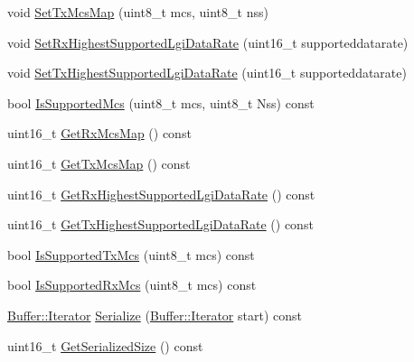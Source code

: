 \begin{DoxyCompactItemize}
\item 
void \hyperlink{classns3_1_1VhtCapabilities_a4acad44449603f46a9a83e858e226fe2}{Set\+Tx\+Mcs\+Map} (uint8\+\_\+t mcs, uint8\+\_\+t nss)
\item 
void \hyperlink{classns3_1_1VhtCapabilities_a76d505e19a02e262781f4b2a137ee316}{Set\+Rx\+Highest\+Supported\+Lgi\+Data\+Rate} (uint16\+\_\+t supporteddatarate)
\item 
void \hyperlink{classns3_1_1VhtCapabilities_ad3f4d476786fab6795be0224dd6ed26e}{Set\+Tx\+Highest\+Supported\+Lgi\+Data\+Rate} (uint16\+\_\+t supporteddatarate)
\item 
bool \hyperlink{classns3_1_1VhtCapabilities_aba04acc79ee860a2542e34a32b2e0bc1}{Is\+Supported\+Mcs} (uint8\+\_\+t mcs, uint8\+\_\+t Nss) const 
\item 
uint16\+\_\+t \hyperlink{classns3_1_1VhtCapabilities_a9047384dc8135824357533a0fcc2d26f}{Get\+Rx\+Mcs\+Map} () const 
\item 
uint16\+\_\+t \hyperlink{classns3_1_1VhtCapabilities_a09f6821d4d89fcf4a7781a2c00b7896f}{Get\+Tx\+Mcs\+Map} () const 
\item 
uint16\+\_\+t \hyperlink{classns3_1_1VhtCapabilities_a4bfa9e42b6b536680d9ce6f6820b92c7}{Get\+Rx\+Highest\+Supported\+Lgi\+Data\+Rate} () const 
\item 
uint16\+\_\+t \hyperlink{classns3_1_1VhtCapabilities_a9f13a856c4c1642836d643d7bef32abd}{Get\+Tx\+Highest\+Supported\+Lgi\+Data\+Rate} () const 
\item 
bool \hyperlink{classns3_1_1VhtCapabilities_a9ce6b770882cb97dca5f1b51ae508974}{Is\+Supported\+Tx\+Mcs} (uint8\+\_\+t mcs) const 
\item 
bool \hyperlink{classns3_1_1VhtCapabilities_a88e22813d583ecc8626822fd3a1f3b75}{Is\+Supported\+Rx\+Mcs} (uint8\+\_\+t mcs) const 
\item 
\hyperlink{classns3_1_1Buffer_1_1Iterator}{Buffer\+::\+Iterator} \hyperlink{classns3_1_1VhtCapabilities_aff8e88955023a52b8901af72a6428923}{Serialize} (\hyperlink{classns3_1_1Buffer_1_1Iterator}{Buffer\+::\+Iterator} start) const 
\item 
uint16\+\_\+t \hyperlink{classns3_1_1VhtCapabilities_af78d811d3d22fd34de1fd886c7a8e96a}{Get\+Serialized\+Size} () const 
\end{DoxyCompactItemize}
